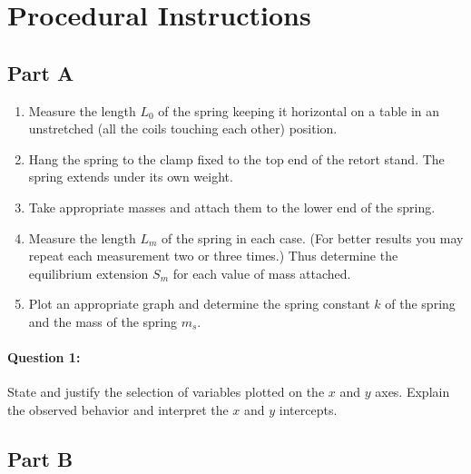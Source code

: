 \section*{Procedural Instructions}

\subsection*{Part A}
\begin{enumerate}
\item Measure the length $L_0$ of the spring keeping it horizontal on a table in an unstretched (all the coils touching each other) position.
\item Hang the spring to the clamp fixed to the top end of the retort stand. The spring extends under its own weight.
\item Take appropriate masses and attach them to the lower end of the spring. 
\item Measure the length $L_m$ of the spring in each case. (For better results you may repeat
each measurement two or three times.) Thus determine the equilibrium extension $S_m$ for each value of mass attached.
\item Plot an appropriate graph and determine the spring constant $k$ of the spring and the mass of the spring $m_s$.
\end{enumerate}

\paragraph{Question 1:} State and justify the selection of variables plotted on the $x$ and $y$ axes. Explain the observed behavior and interpret the $x$ and $y$ intercepts.



\subsection*{Part B}

